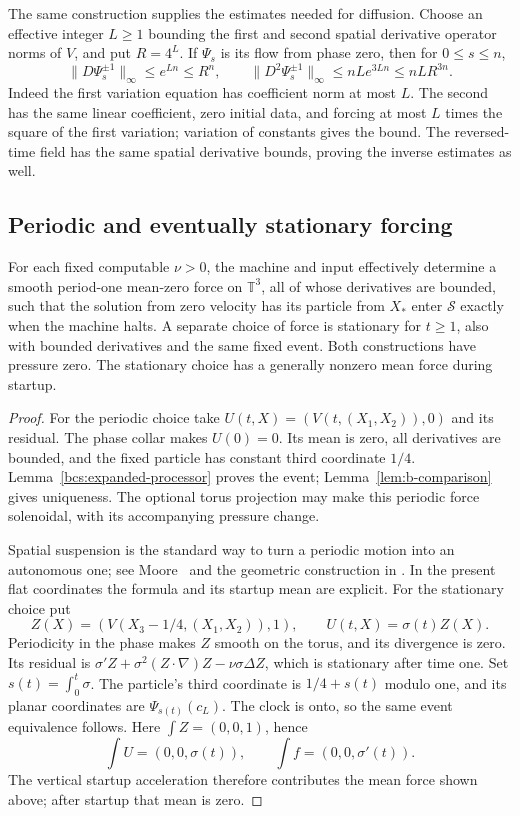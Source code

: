 The same construction supplies the estimates needed for diffusion. Choose an effective integer $L\ge1$ bounding the first and second spatial derivative operator norms of $V$, and put $R=4^L$. If $\Psi_s$ is its flow from phase zero, then for $0\le s\le n$,
\begin{equation}\label{bcs:expanded-variation}
 \|D\Psi_s^{\pm1}\|_\infty\le e^{Ln}\le R^n,
 \qquad \|D^2\Psi_s^{\pm1}\|_\infty\le nLe^{3Ln}\le nLR^{3n}.
\end{equation}
Indeed the first variation equation has coefficient norm at most $L$. The second has the same linear coefficient, zero initial data, and forcing at most $L$ times the square of the first variation; variation of constants gives the bound. The reversed-time field has the same spatial derivative bounds, proving the inverse estimates as well.

\subsection{Periodic and eventually stationary forcing}
\begin{proposition}\label{bcs:expanded-material}
For each fixed computable $\nu>0$, the machine and input effectively determine a smooth period-one mean-zero force on $\mathbb T^3$, all of whose derivatives are bounded, such that the solution from zero velocity has its particle from $X_*$ enter $\mathcal S$ exactly when the machine halts. A separate choice of force is stationary for $t\ge1$, also with bounded derivatives and the same fixed event. Both constructions have pressure zero. The stationary choice has a generally nonzero mean force during startup.
\end{proposition}
\begin{proof}
For the periodic choice take $U(t,X)=(V(t,(X_1,X_2)),0)$ and its residual. The phase collar makes $U(0)=0$. Its mean is zero, all derivatives are bounded, and the fixed particle has constant third coordinate $1/4$. Lemma~\ref{bcs:expanded-processor} proves the event; Lemma~\ref{lem:b-comparison} gives uniqueness. The optional torus projection may make this periodic force solenoidal, with its accompanying pressure change.

Spatial suspension is the standard way to turn a periodic motion into an autonomous one; see Moore~\cite[Section~6]{Moore1991} and the geometric construction in \cite[Theorem~3.1]{CardonaMirandaPeraltaSalasPresas2021}. In the present flat coordinates the formula and its startup mean are explicit. For the stationary choice put
\[
 Z(X)=(V(X_3-1/4,(X_1,X_2)),1),\qquad U(t,X)=\sigma(t)Z(X).
\]
Periodicity in the phase makes $Z$ smooth on the torus, and its divergence is zero. Its residual is
$\sigma'Z+\sigma^2(Z\cdot\nabla)Z-\nu\sigma\Delta Z$,
which is stationary after time one. Set $s(t)=\int_0^t\sigma$. The particle's third coordinate is $1/4+s(t)$ modulo one, and its planar coordinates are $\Psi_{s(t)}(c_L)$. The clock is onto, so the same event equivalence follows. Here $\int Z=(0,0,1)$, hence
\[
 \int U=(0,0,\sigma(t)),\qquad \int f=(0,0,\sigma'(t)).
\]
The vertical startup acceleration therefore contributes the mean force shown above; after startup that mean is zero.
\end{proof}

